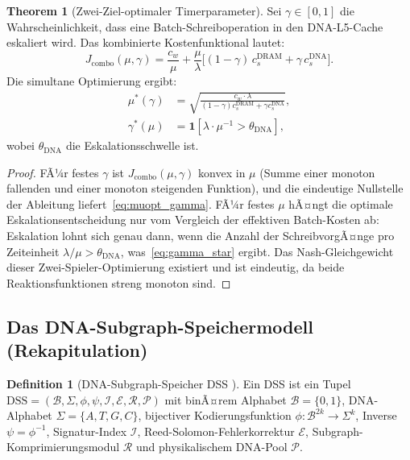 ﻿\documentclass[a4paper,12pt]{article}
\theoremstyle{definition}
\newtheorem{definition}{Definition}[section]
\newtheorem{theorem}{Theorem}[section]
\begin{document}
\begin{theorem}[Zwei-Ziel-optimaler Timerparameter]
  \label{thm:twotarget}
  Sei $\gamma \in [0,1]$ die Wahrscheinlichkeit, dass eine Batch-Schreiboperation
  in den DNA-L5-Cache eskaliert wird. Das kombinierte Kostenfunktional lautet:
  \begin{equation}
    J_{\mathrm{combo}}(\mu, \gamma) = \frac{c_w}{\mu}
    + \frac{\mu}{\lambda}\bigl[(1-\gamma)\,c_s^{\mathrm{DRAM}} + \gamma\,c_s^{\mathrm{DNA}}\bigr].
    \label{eq:combo_cost}
  \end{equation}
  Die simultane Optimierung ergibt:
  \begin{align}
    \mu^*(\gamma) &= \sqrt{\frac{c_w \cdot \lambda}{(1-\gamma) c_s^{\mathrm{DRAM}} + \gamma c_s^{\mathrm{DNA}}}},
    \label{eq:muopt_gamma} \\
    \gamma^*(\mu) &= \mathbf{1}\!\left[\lambda \cdot \mu^{-1} > \theta_{\mathrm{DNA}}\right],
    \label{eq:gamma_star}
  \end{align}
  wobei $\theta_{\mathrm{DNA}}$ die Eskalationsschwelle ist.
\end{theorem}

\begin{proof}
  FÃ¼r festes $\gamma$ ist $J_{\mathrm{combo}}(\mu, \gamma)$ konvex in $\mu$
  (Summe einer monoton fallenden und einer monoton steigenden Funktion),
  und die eindeutige Nullstelle der Ableitung liefert~\eqref{eq:muopt_gamma}.
  FÃ¼r festes $\mu$ hÃ¤ngt die optimale Eskalationsentscheidung nur vom
  Vergleich der effektiven Batch-Kosten ab: Eskalation lohnt sich genau dann,
  wenn die Anzahl der SchreibvorgÃ¤nge pro Zeiteinheit
  $\lambda / \mu > \theta_{\mathrm{DNA}}$, was~\eqref{eq:gamma_star} ergibt.
  Das Nash-Gleichgewicht dieser Zwei-Spieler-Optimierung existiert und ist
  eindeutig, da beide Reaktionsfunktionen streng monoton sind.
\end{proof}

\subsection{Das DNA-Subgraph-Speichermodell (Rekapitulation)}

\begin{definition}[DNA-Subgraph-Speicher DSS \cite{epp2026dnastor}]
  \label{def:dss}
  Ein DSS ist ein Tupel
  $\mathrm{DSS} = (\mathcal{B}, \Sigma, \phi, \psi, \mathcal{I}, \mathcal{E}, \mathcal{R}, \mathcal{P})$
  mit binÃ¤rem Alphabet $\mathcal{B}=\{0,1\}$, DNA-Alphabet $\Sigma=\{A,T,G,C\}$,
  bijectiver Kodierungsfunktion $\phi: \mathcal{B}^{2k} \to \Sigma^k$,
  Inverse $\psi = \phi^{-1}$, Signatur-Index $\mathcal{I}$,
  Reed-Solomon-Fehlerkorrektur $\mathcal{E}$, Subgraph-Komprimierungsmodul $\mathcal{R}$
  und physikalischem DNA-Pool $\mathcal{P}$.
\end{definition}
\end{document}
